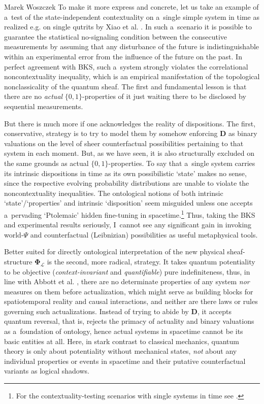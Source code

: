 \begin{artengenv}{Marek Woszczek}
To make it more express and concrete, let us take an example of a~test of the state-independent contextuality on a~single simple system in time as realized e.g. on single qutrits by Xiao et al.
\parencite*[][]{cavalcanti_classical_2018}. %
 In such a~scenario it is possible to guarantee the statistical no-signaling condition between the consecutive measurements by assuming that any disturbance of the future is indistinguishable within an experimental error from the influence of the future on the past. In perfect agreement with BKS, such a~system strongly violates the correlational noncontextuality inequality, which is an empirical manifestation of the topological nonclassicality of the quantum sheaf. The first and fundamental lesson is that there are no \textit{actual} $\{0,1\}$-properties of it just waiting there to be disclosed by sequential measurements.

But there is much more if one acknowledges the reality of dispositions. The first, conservative, strategy is to try to model them by somehow enforcing \textbf{D} as binary valuations on the level of sheer counterfactual possibilities pertaining to that system in each moment. But, as we have seen, it is also structurally excluded on the same grounds as actual $\{0, 1\}$-properties. To say that a~single system carries its intrinsic dispositions in time as its own possibilistic ‘state' makes no sense, since the respective evolving probability distributions are unable to violate the noncontextuality inequalities. The ontological notions of both intrinsic ‘state'/‘properties' and intrinsic ‘disposition' seem misguided unless one accepts a~pervading ‘Ptolemaic' hidden fine-tuning in spacetime.\footnote{For the contextuality-testing scenarios with single systems in time see
\parencite[][]{cavalcanti_classical_2018}. %
 } Thus, taking the BKS and experimental results seriously, I~cannot see any significant gain in invoking world-$\Psi$ and counterfactual (Leibnizian) possibilities as useful metaphysical tools.

Better suited for directly ontological interpretation of the new physical sheaf-structure $\bm{\Phi}_{\mathcal{L}}$ is the second, more radical, strategy. It takes quantum potentiality to be objective (\textit{context-invariant} and \textit{quantifiable}) pure indefiniteness, thus, in line with Abbott et al.
\parencite*[][]{howard_contextuality_2014}, %
 there are no determinate properties of any system \textit{nor} measures on them before actualization, which might serve as building blocks for spatiotemporal reality and causal interactions, and neither are there laws or rules governing such actualizations. Instead of trying to abide by \textbf{D}, it accepts quantum reversal, that is, rejects the primacy of actuality and binary valuations as a~foundation of ontology, hence actual systems in spacetime cannot be its basic entities at all. Here, in stark contrast to classical mechanics, quantum theory is only about potentiality without mechanical states, \textit{not} about any individual properties or events in spacetime and their putative counterfactual variants as logical shadows.


\end{artengenv}
